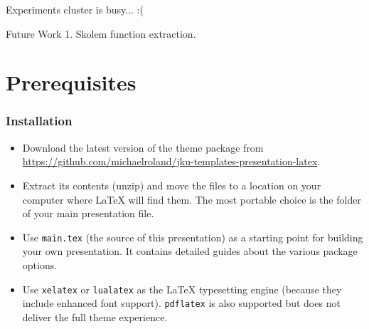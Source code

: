 \documentclass[utf8,aspectratio=169,ngerman,english]{beamer}
\begin{document}
\begin{frame}{Experiments}
    cluster is busy... :(
\end{frame}

\begin{frame}{Future Work}
    1. Skolem function extraction.
\end{frame}




\iffalse
\section{Prerequisites}

\begin{frame}
\frametitle{Installation}

\begin{itemize}
\item Download the latest version of the theme package from \url{https://github.com/michaelroland/jku-templates-presentation-latex}.
\item Extract its contents (unzip) and move the files to a location on your computer where {\LaTeX} will find them. The most portable choice is the folder of your main presentation file.
\item Use \texttt{main.tex} (the source of this presentation) as a starting point for building your own presentation. It contains detailed guides about the various package options.
\item Use \texttt{xelatex} or \texttt{lualatex} as the {\LaTeX} typesetting engine (because they include enhanced font support). \texttt{pdflatex} is also supported but does not deliver the full theme experience.
\end{itemize}
\end{frame}
\end{document}
